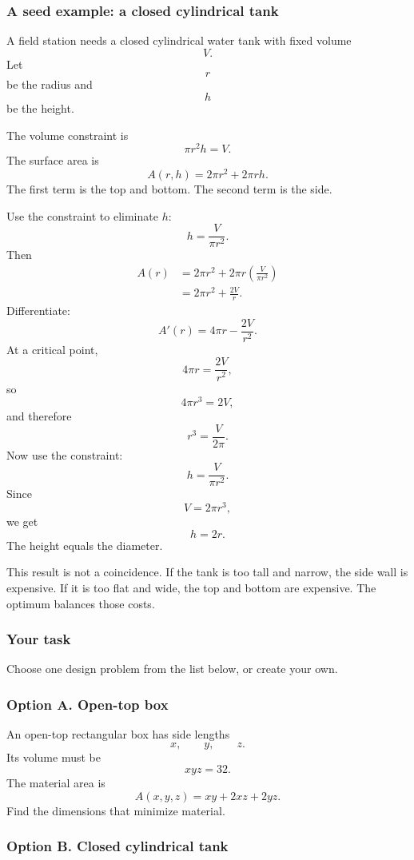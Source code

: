 \subsubsection*{A seed example: a closed cylindrical tank}

A field station needs a closed cylindrical water tank with fixed volume
\[
    V.
\]
Let
\[
    r
\]
be the radius and
\[
    h
\]
be the height.

The volume constraint is
\[
\boxed{
    \pi r^2h=V.
}
\]
The surface area is
\[
\boxed{
    A(r,h)=2\pi r^2+2\pi rh.
}
\]
The first term is the top and bottom.  The second term is the side.

Use the constraint to eliminate \(h\):
\[
    h=\frac{V}{\pi r^2}.
\]
Then
\[
\begin{aligned}
A(r)
&=
2\pi r^2+2\pi r\left(\frac{V}{\pi r^2}\right)\\
&=
2\pi r^2+\frac{2V}{r}.
\end{aligned}
\]
Differentiate:
\[
    A'(r)=4\pi r-\frac{2V}{r^2}.
\]
At a critical point,
\[
    4\pi r=\frac{2V}{r^2},
\]
so
\[
    4\pi r^3=2V,
\]
and therefore
\[
\boxed{
    r^3=\frac{V}{2\pi}.
}
\]
Now use the constraint:
\[
    h=\frac{V}{\pi r^2}.
\]
Since
\[
    V=2\pi r^3,
\]
we get
\[
\boxed{
    h=2r.
}
\]
The height equals the diameter.

This result is not a coincidence.  If the tank is too tall and narrow, the side wall is
expensive.  If it is too flat and wide, the top and bottom are expensive.  The optimum
balances those costs.

\subsubsection*{Your task}

Choose one design problem from the list below, or create your own.

\subsubsection*{Option A. Open-top box}

An open-top rectangular box has side lengths
\[
    x,\qquad y,\qquad z.
\]
Its volume must be
\[
    xyz=32.
\]
The material area is
\[
    A(x,y,z)=xy+2xz+2yz.
\]
Find the dimensions that minimize material.

\subsubsection*{Option B. Closed cylindrical tank}

